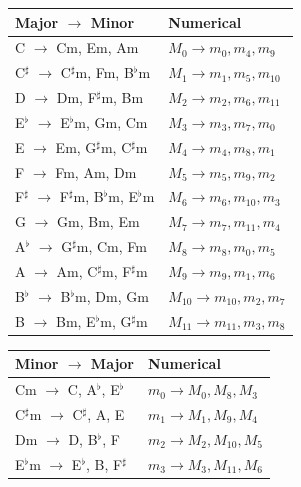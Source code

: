 \documentclass[11pt,letterpaper]{amsart}
\begin{document}
{\tiny \begin{table}[H]
    \centering
    \begin{minipage}{0.48\textwidth}
        \centering
        \begin{tabular}{ll}
        \toprule
        \textbf{Major $\to$ Minor} & \textbf{Numerical} \\
        \midrule
        C $\to$ Cm, Em, Am & $M_0 \to m_0, m_4, m_9$ \\
        C$^\sharp$ $\to$ C$^\sharp$m, Fm, B$^\flat$m & $M_1 \to m_1, m_5, m_{10}$ \\
        D $\to$ Dm, F$^\sharp$m, Bm & $M_2 \to m_2, m_6, m_{11}$ \\
        E$^\flat$ $\to$ E$^\flat$m, Gm, Cm & $M_3 \to m_3, m_7, m_0$ \\
        E $\to$ Em, G$^\sharp$m, C$^\sharp$m & $M_4 \to m_4, m_8, m_1$ \\
        F $\to$ Fm, Am, Dm & $M_5 \to m_5, m_9, m_2$ \\
        F$^\sharp$ $\to$ F$^\sharp$m, B$^\flat$m, E$^\flat$m & $M_6 \to m_6, m_{10}, m_3$ \\
        G $\to$ Gm, Bm, Em & $M_7 \to m_7, m_{11}, m_4$ \\
        A$^\flat$ $\to$ G$^\sharp$m, Cm, Fm & $M_8 \to m_8, m_0, m_5$ \\
        A $\to$ Am, C$^\sharp$m, F$^\sharp$m & $M_9 \to m_9, m_1, m_6$ \\
        B$^\flat$ $\to$ B$^\flat$m, Dm, Gm & $M_{10} \to m_{10}, m_2, m_7$ \\
        B $\to$ Bm, E$^\flat$m, G$^\sharp$m & $M_{11} \to m_{11}, m_3, m_8$ \\
        \bottomrule
        \end{tabular}
    \end{minipage}\hfill
    \begin{minipage}{0.48\textwidth}
        \centering
        \begin{tabular}{ll}
        \toprule
        \textbf{Minor $\to$ Major} & \textbf{Numerical} \\
        \midrule
        Cm $\to$ C, A$^\flat$, E$^\flat$ & $m_0 \to M_0, M_8, M_3$ \\
        C$^\sharp$m $\to$ C$^\sharp$, A, E & $m_1 \to M_1, M_9, M_4$ \\
        Dm $\to$ D, B$^\flat$, F & $m_2 \to M_2, M_{10}, M_5$ \\
        E$^\flat$m $\to$ E$^\flat$, B, F$^\sharp$ & $m_3 \to M_3, M_{11}, M_6$ \\

\end{tabular}
\end{minipage}
\end{table}}
\end{document}
